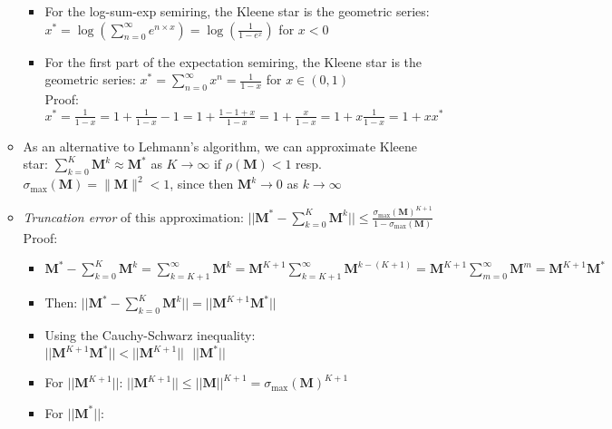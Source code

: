 \begin{itemize}
\begin{itemize}
\begin{itemize}
            \item For the log-sum-exp semiring, the Kleene star is the geometric series:
            $
            x^* = \log(\sum_{n=0}^\infty e^{n\times x}) = \log (\frac{1}{1 - e^x})$ for $x < 0$
            \item For the first part of the expectation semiring, the Kleene star is the geometric series:
            $
            x^* = \sum_{n=0}^\infty x^n = \frac{1}{1 - x}$ for $x \in (0, 1)$\\
            Proof:
            $
            x^* = \frac{1}{1 - x} = 1 + \frac{1}{1 - x} -1 = 1 + \frac{1 - 1 + x}{1 - x} = 1 + \frac{x}{1 - x} = 1 + x \frac{1}{1 - x} = 1 + x x^*
            $
        \end{itemize}
        \item As an alternative to Lehmann's algorithm, we can approximate Kleene star:
        $
        \sum_{k=0}^{K} \boldsymbol{M}^k \approx \boldsymbol{M}^*$ as $K \to \infty$ if $\rho(\boldsymbol{M}) < 1$ resp. $\sigma_{\max}(\boldsymbol{M}) = \| \boldsymbol{M} \|^2 < 1
        $, since then $\boldsymbol{M}^k \to 0$ as $k \to \infty$
        \item \emph{Truncation error} of this approximation:
        $
        || \boldsymbol{M}^* - \sum_{k=0}^K \boldsymbol{M}^k || \leq \frac{\sigma_{\max}(\boldsymbol{M})^{K+1}}{1 - \sigma_{\max}(\boldsymbol{M})}
        $\\
        Proof:
        \begin{itemize}
            \item $\boldsymbol{M}^* - \sum_{k=0}^K \boldsymbol{M}^k = \sum_{k=K+1}^\infty \boldsymbol{M}^k = \boldsymbol{M}^{K+1} \sum_{k=K+1}^\infty \boldsymbol{M}^{k-(K+1)} = \boldsymbol{M}^{K+1} \sum_{m=0}^\infty \boldsymbol{M}^m = \boldsymbol{M}^{K+1} \boldsymbol{M}^*$
            \item Then:
            $
            || \boldsymbol{M}^* - \sum_{k=0}^K \boldsymbol{M}^k || = || \boldsymbol{M}^{K+1} \boldsymbol{M}^* ||
            $
            \item Using the Cauchy-Schwarz inequality:
            $
            || \boldsymbol{M}^{K+1} \boldsymbol{M}^* || < || \boldsymbol{M}^{K+1} || \textrm{ } || \boldsymbol{M}^* ||
            $
            \item For $|| \boldsymbol{M}^{K+1} ||$:
            $
            || \boldsymbol{M}^{K+1} || \leq || \boldsymbol{M} ||^{K+1} = \sigma_{\max}(\boldsymbol{M})^{K+1}
            $
            \item For $|| \boldsymbol{M}^* ||$:

\end{itemize}
\end{itemize}
\end{itemize}
